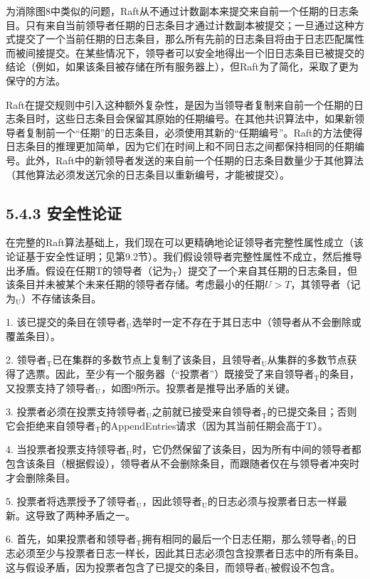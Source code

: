 \documentclass[12pt,a4paper]{report} %
\begin{document}
为消除图8中类似的问题，Raft从不通过计数副本来提交来自前一个任期的日志条目。只有来自当前领导者任期的日志条目才通过计数副本被提交；一旦通过这种方式提交了一个当前任期的日志条目，那么所有先前的日志条目将由于日志匹配属性而被间接提交。在某些情况下，领导者可以安全地得出一个旧日志条目已被提交的结论（例如，如果该条目被存储在所有服务器上），但Raft为了简化，采取了更为保守的方法。

Raft在提交规则中引入这种额外复杂性，是因为当领导者复制来自前一个任期的日志条目时，这些日志条目会保留其原始的任期编号。在其他共识算法中，如果新领导者复制前一个“任期”的日志条目，必须使用其新的“任期编号”。Raft的方法使得日志条目的推理更加简单，因为它们在时间上和不同日志之间都保持相同的任期编号。此外，Raft中的新领导者发送的来自前一个任期的日志条目数量少于其他算法（其他算法必须发送冗余的日志条目以重新编号，才能被提交）。

\subsection*{5.4.3 安全性论证}

在完整的Raft算法基础上，我们现在可以更精确地论证领导者完整性属性成立（该论证基于安全性证明；见第9.2节）。我们假设领导者完整性属性不成立，然后推导出矛盾。假设在任期T的领导者（记为${ }_{\mathrm{T}}$）提交了一个来自其任期的日志条目，但该条目并未被某个未来任期的领导者存储。考虑最小的任期$U > T$，其领导者（记为${ }_{\mathrm{U}}$）不存储该条目。

1. 该已提交的条目在领导者${ }_{\mathrm{U}}$选举时一定不存在于其日志中（领导者从不会删除或覆盖条目）。

2. 领导者${ }_{\mathrm{T}}$已在集群的多数节点上复制了该条目，且领导者${ }_{\mathrm{U}}$从集群的多数节点获得了选票。因此，至少有一个服务器（“投票者”）既接受了来自领导者${ }_{\mathrm{T}}$的条目，又投票支持了领导者${ }_{\mathrm{U}}$，如图9所示。投票者是推导出矛盾的关键。

3. 投票者必须在投票支持领导者${ }_{\mathrm{U}}$之前就已接受来自领导者${ }_{\mathrm{T}}$的已提交条目；否则它会拒绝来自领导者${ }_{\mathrm{T}}$的AppendEntries请求（因为其当前任期会高于T）。

4. 当投票者投票支持领导者${ }_{\mathrm{U}}$时，它仍然保留了该条目，因为所有中间的领导者都包含该条目（根据假设），领导者从不会删除条目，而跟随者仅在与领导者冲突时才会删除条目。

5. 投票者将选票授予了领导者${ }_{\mathrm{U}}$，因此领导者${ }_{\mathrm{U}}$的日志必须与投票者日志一样最新。这导致了两种矛盾之一。

6. 首先，如果投票者和领导者${ }_{\mathrm{T}}$拥有相同的最后一个日志任期，那么领导者${ }_{\mathrm{U}}$的日志必须至少与投票者日志一样长，因此其日志必须包含投票者日志中的所有条目。这与假设矛盾，因为投票者包含了已提交的条目，而领导者${ }_{\mathrm{U}}$被假设不包含。
\end{document}

